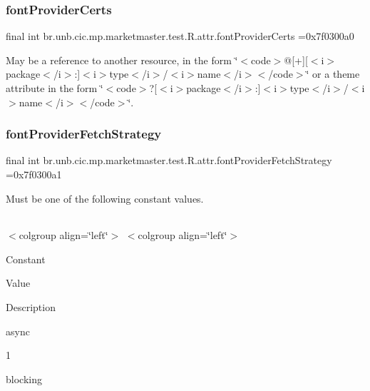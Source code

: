 \subsubsection{\texorpdfstring{font\+Provider\+Certs}{fontProviderCerts}}
{\footnotesize\ttfamily final int br.\+unb.\+cic.\+mp.\+marketmaster.\+test.\+R.\+attr.\+font\+Provider\+Certs =0x7f0300a0\hspace{0.3cm}{\ttfamily [static]}}

May be a reference to another resource, in the form \char`\"{}$<$code$>$@\mbox{[}+\mbox{]}\mbox{[}$<$i$>$package$<$/i$>$\+:\mbox{]}$<$i$>$type$<$/i$>$/$<$i$>$name$<$/i$>$$<$/code$>$\char`\"{} or a theme attribute in the form \char`\"{}$<$code$>$?\mbox{[}$<$i$>$package$<$/i$>$\+:\mbox{]}$<$i$>$type$<$/i$>$/$<$i$>$name$<$/i$>$$<$/code$>$\char`\"{}. \mbox{\label{classbr_1_1unb_1_1cic_1_1mp_1_1marketmaster_1_1test_1_1R_1_1attr_aa1b2de1f82c82c1e2f8b19d0af5064e5}} 
\subsubsection{\texorpdfstring{font\+Provider\+Fetch\+Strategy}{fontProviderFetchStrategy}}
{\footnotesize\ttfamily final int br.\+unb.\+cic.\+mp.\+marketmaster.\+test.\+R.\+attr.\+font\+Provider\+Fetch\+Strategy =0x7f0300a1\hspace{0.3cm}{\ttfamily [static]}}

Must be one of the following constant values.

\tabulinesep=1mm
\begin{longtabu} spread 0pt [c]{*{0}{|X[-1]}|}
\hline
\end{longtabu}
$<$colgroup align=\char`\"{}left\char`\"{}$>$ $<$colgroup align=\char`\"{}left\char`\"{}$>$ 

Constant

Value

Description 

async

1

blocking

